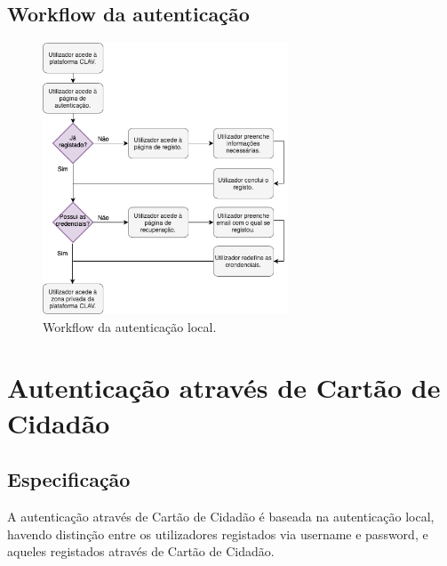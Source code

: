 \subsection{Workflow da autenticação}
\vspace{-9mm}
\begin{figure}[ht!]
    \centering
    \includegraphics[width=0.65\textwidth]{img/diagramas/authlocal/AuthLocal.png}
    \caption{Workflow da autenticação local.}
    \label{fig:flow_authlocal}
\end{figure}

\cleardoublepage
\section{Autenticação através de Cartão de Cidadão}
\subsection{Especificação}

A autenticação através de Cartão de Cidadão é baseada na autenticação local, havendo distinção entre os utilizadores registados via username e password, e aqueles registados através de Cartão de Cidadão.

